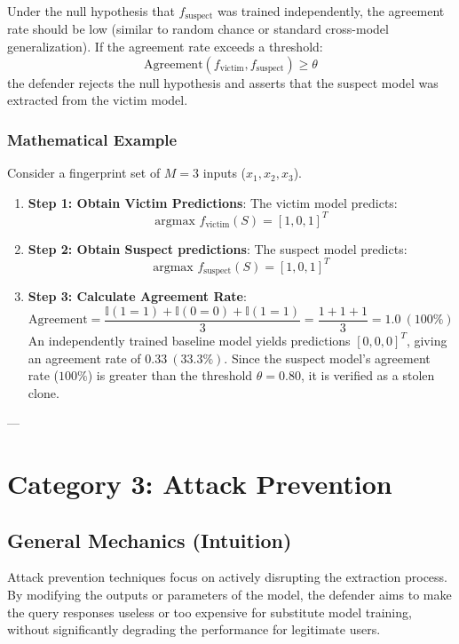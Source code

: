 \documentclass{article}
\begin{document}
Under the null hypothesis that $f_{\text{suspect}}$ was trained independently, the agreement rate should be low (similar to random chance or standard cross-model generalization). If the agreement rate exceeds a threshold:
\begin{equation}
    \text{Agreement}(f_{\text{victim}}, f_{\text{suspect}}) \ge \theta
\end{equation}
the defender rejects the null hypothesis and asserts that the suspect model was extracted from the victim model.

\subsubsection{Mathematical Example}
Consider a fingerprint set of $M=3$ inputs ($x_1, x_2, x_3$).
\begin{enumerate}
    \item \textbf{Step 1: Obtain Victim Predictions}: The victim model predicts:
    $$\text{argmax } f_{\text{victim}}(S) = [1, 0, 1]^T$$
    
    \item \textbf{Step 2: Obtain Suspect predictions}: The suspect model predicts:
    $$\text{argmax } f_{\text{suspect}}(S) = [1, 0, 1]^T$$
    
    \item \textbf{Step 3: Calculate Agreement Rate}:
    $$\text{Agreement} = \frac{\mathbb{I}(1=1) + \mathbb{I}(0=0) + \mathbb{I}(1=1)}{3} = \frac{1 + 1 + 1}{3} = 1.0 \ (100\%)$$
    An independently trained baseline model yields predictions $[0, 0, 0]^T$, giving an agreement rate of $0.33 \ (33.3\%)$. Since the suspect model's agreement rate ($100\%$) is greater than the threshold $\theta = 0.80$, it is verified as a stolen clone.
\end{enumerate}

---

\section{Category 3: Attack Prevention}

\subsection{General Mechanics (Intuition)}
Attack prevention techniques focus on actively disrupting the extraction process. By modifying the outputs or parameters of the model, the defender aims to make the query responses useless or too expensive for substitute model training, without significantly degrading the performance for legitimate users.
\end{document}
